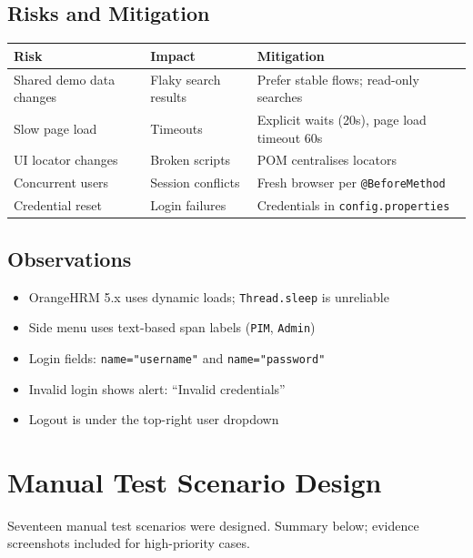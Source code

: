﻿\documentclass[11pt,a4paper]{article}
\begin{document}
\subsection{Risks and Mitigation}
\begin{table}[H]
\centering
\small
\begin{tabular}{@{}p{3.2cm}p{3.5cm}p{5.5cm}@{}}
\toprule
\textbf{Risk} & \textbf{Impact} & \textbf{Mitigation} \\
\midrule
Shared demo data changes & Flaky search results & Prefer stable flows; read-only searches \\
Slow page load & Timeouts & Explicit waits (20s), page load timeout 60s \\
UI locator changes & Broken scripts & POM centralises locators \\
Concurrent users & Session conflicts & Fresh browser per \texttt{@BeforeMethod} \\
Credential reset & Login failures & Credentials in \texttt{config.properties} \\
\bottomrule
\end{tabular}
\end{table}

\subsection{Observations}
\begin{itemize}[noitemsep]
  \item OrangeHRM 5.x uses dynamic loads; \texttt{Thread.sleep} is unreliable
  \item Side menu uses text-based span labels (\texttt{PIM}, \texttt{Admin})
  \item Login fields: \texttt{name="username"} and \texttt{name="password"}
  \item Invalid login shows alert: ``Invalid credentials''
  \item Logout is under the top-right user dropdown
\end{itemize}

\section{Manual Test Scenario Design}

\noindent Seventeen manual test scenarios were designed. Summary below; evidence screenshots included for high-priority cases.
\end{document}
